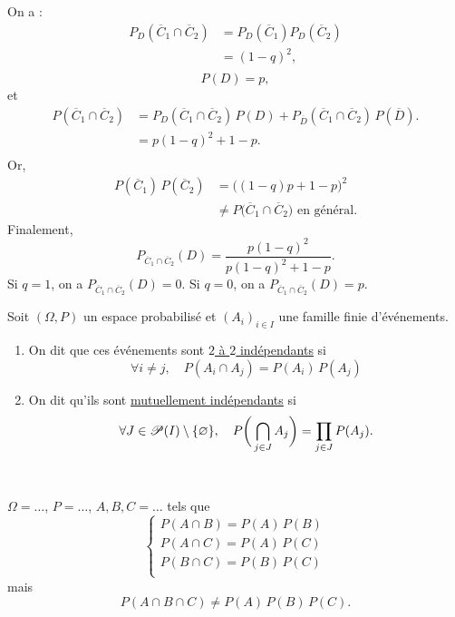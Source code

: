 \begin{exm}
	On a : 
	\begin{align*}
		P_D\left( \overline{C}_1 \cap \overline{C}_2 \right) &= P_D\left( \overline{C}_1 \right) P_D\left( \overline{C}_2 \right) \\
		&= (1-q)^2, \\
	\end{align*} \[
		P(D) = p,
	\] et 
	\begin{align*}
		P\left( \overline{C}_1 \cap \overline{C}_2 \right) &= P_D(\overline{C}_1 \cap \overline{C}_2)\,P(D) + P_{\overline{D}}(\overline{C}_1 \cap \overline{C}_2)\,P(\overline{D}).\\
		&= p(1-q)^2 + 1-p. \\
	\end{align*}
	Or, 
	\begin{align*}
		P\left( \overline{C}_1 \right) \,P\left( \overline{C}_2 \right) &= \big((1-q)p+1-p\big)^2 \\
		&\neq P\big(\overline{C}_1 \cap \overline{C}_2\big) \text{ en général}.
	\end{align*}
	Finalement, \[
		P_{\overline{C}_1 \cap \overline{C}_2}(D) = \frac{p(1-q)^2}{p(1-q)^2 + 1 - p}.
	\] Si $q = 1$, on a $P_{\overline{C}_1 \cap \overline{C}_2}(D) = 0$. Si $q = 0$, on a $P_{\overline{C}_1 \cap \overline{C}_2}(D) = p$.
\end{exm}

\begin{defn}
	Soit $(\Omega, P)$ un espace probabilisé et $(A_i)_{i\in I}$ une famille finie d'événements.

	\begin{enumerate}
		\item On dit que ces événements sont \underline{$2$ à $2$ indépendants} si \[
				\forall i \neq j,\quad P(A_i \cap A_j) = P(A_i)\,P(A_j)
			\]
		\item On dit qu'ils sont \underline{mutuellement indépendants} si \[
			\forall J \in \mathcal{P}(I) \setminus \{ \varnothing \},\quad P\bigg( \bigcap_{j \in J} A_j \bigg) = \prod_{j \in J} P(A_j).
		\]
	\end{enumerate}
\end{defn}

\begin{exm}\relax~

	$\Omega = \ldots$, $P = \ldots$, $A, B, C = \ldots$ tels que \[
		\begin{cases}
			P(A\cap B) = P(A)\, P(B)\\
			P(A\cap C) = P(A)\, P(C)\\
			P(B\cap C) = P(B)\, P(C)\\
		\end{cases}
	\] mais \[
		P(A \cap B \cap C) \neq P(A) \, P(B) \, P(C).
	\]
\end{exm}

